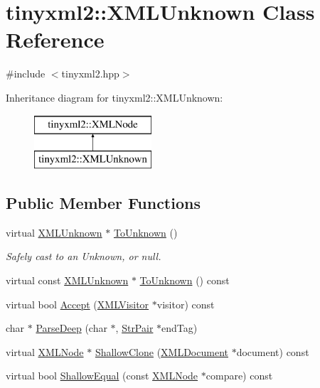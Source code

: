 \hypertarget{classtinyxml2_1_1_x_m_l_unknown}{\section{tinyxml2\-:\-:X\-M\-L\-Unknown Class Reference}
\label{classtinyxml2_1_1_x_m_l_unknown}
}


{\ttfamily \#include $<$tinyxml2.\-hpp$>$}

Inheritance diagram for tinyxml2\-:\-:X\-M\-L\-Unknown\-:\begin{figure}[H]
\begin{center}
\leavevmode
\includegraphics[height=2.000000cm]{classtinyxml2_1_1_x_m_l_unknown}
\end{center}
\end{figure}
\subsection*{Public Member Functions}
\begin{DoxyCompactItemize}
\item 
virtual \hyperlink{classtinyxml2_1_1_x_m_l_unknown}{X\-M\-L\-Unknown} $\ast$ \hyperlink{classtinyxml2_1_1_x_m_l_unknown_af4374856421921cad578c8affae872b6}{To\-Unknown} ()
\begin{DoxyCompactList}\small\item\em Safely cast to an Unknown, or null. \end{DoxyCompactList}\item 
virtual const \hyperlink{classtinyxml2_1_1_x_m_l_unknown}{X\-M\-L\-Unknown} $\ast$ \hyperlink{classtinyxml2_1_1_x_m_l_unknown_a257987e79955399e6e9f119b58d4bb30}{To\-Unknown} () const 
\item 
virtual bool \hyperlink{classtinyxml2_1_1_x_m_l_unknown_a0d341ab804a1438a474810bb5bd29dd5}{Accept} (\hyperlink{classtinyxml2_1_1_x_m_l_visitor}{X\-M\-L\-Visitor} $\ast$visitor) const 
\item 
char $\ast$ \hyperlink{classtinyxml2_1_1_x_m_l_unknown_a0e4f3509dee42a4d45a7f0002be568cc}{Parse\-Deep} (char $\ast$, \hyperlink{classtinyxml2_1_1_str_pair}{Str\-Pair} $\ast$end\-Tag)
\item 
virtual \hyperlink{classtinyxml2_1_1_x_m_l_node}{X\-M\-L\-Node} $\ast$ \hyperlink{classtinyxml2_1_1_x_m_l_unknown_aa09fc7cb0cd64d6bb9c5ae00ffc549ec}{Shallow\-Clone} (\hyperlink{classtinyxml2_1_1_x_m_l_document}{X\-M\-L\-Document} $\ast$document) const 
\item 
virtual bool \hyperlink{classtinyxml2_1_1_x_m_l_unknown_a0169df157bf69a092b404ca49621ff1a}{Shallow\-Equal} (const \hyperlink{classtinyxml2_1_1_x_m_l_node}{X\-M\-L\-Node} $\ast$compare) const 
\end{DoxyCompactItemize}
